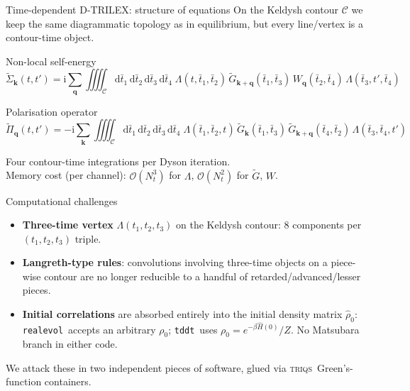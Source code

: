 \documentclass[10pt,aspectratio=169]{beamer}
\newcommand{\Sigmat}{\Sigma}
\newcommand{\Lam}{\Lambda}
\newcommand{\realevol}{\texttt{realevol}}
\newcommand{\tddt}{\texttt{tddt}}
\newcommand{\triqs}{\textsc{triqs}}
\begin{document}
\begin{frame}{Time-dependent D-TRILEX: structure of equations}
  \small
  On the Keldysh contour $\mathcal{C}$ we keep the same diagrammatic
  topology as in equilibrium, but every line/vertex is a contour-time
  object.

  \medskip
  \begin{block}{Non-local self-energy}
    \[
    \tilde \Sigmat_{\bm{k}}(t,t')
    = \mathrm{i}\!\sum_{\bm{q}}\!\!\iiiint_\mathcal{C}\!\!
    \mathrm{d}\bar t_1\,\mathrm{d}\bar t_2\,
    \mathrm{d}\bar t_3\,\mathrm{d}\bar t_4\;
    \Lam(t,\bar t_1,\bar t_2)\,
    \tilde G_{\bm{k}+\bm{q}}(\bar t_1,\bar t_3)\,
    W_{\bm{q}}(\bar t_2,\bar t_4)\,
    \Lam(\bar t_3,t',\bar t_4)
    \]
  \end{block}
  \begin{block}{Polarisation operator}
    \[
    \tilde\Pi_{\bm{q}}(t,t')
    = -\mathrm{i}\!\sum_{\bm{k}}\!\!\iiiint_\mathcal{C}\!\!
    \mathrm{d}\bar t_1\,\mathrm{d}\bar t_2\,
    \mathrm{d}\bar t_3\,\mathrm{d}\bar t_4\;
    \Lam(\bar t_1,\bar t_2,t)\,
    \tilde G_{\bm{k}}(\bar t_1,\bar t_3)\,
    \tilde G_{\bm{k}+\bm{q}}(\bar t_4,\bar t_2)\,
    \Lam(\bar t_3,\bar t_4,t')
    \]
  \end{block}
  \vspace{-0.3em}
  Four contour-time integrations per Dyson iteration.\\
  Memory cost (per channel): $\mathcal{O}(N_t^3)$ for $\Lambda$,
  $\mathcal{O}(N_t^2)$ for $\tilde G$, $W$.
\end{frame}

\begin{frame}{Computational challenges}
  \begin{itemize}
    \item \textbf{Three-time vertex} $\Lambda(t_1,t_2,t_3)$ on the
          Keldysh contour: $8$ components per $(t_1,t_2,t_3)$ triple.
    \item \textbf{Langreth-type rules}: convolutions involving three-time
          objects on a piece-wise contour are no longer reducible to a
          handful of retarded/advanced/lesser pieces.
    \item \textbf{Initial correlations} are absorbed entirely into the
          initial density matrix $\hat\rho_0$: \realevol\ accepts an
          arbitrary $\rho_0$; \tddt\ uses $\rho_0 = e^{-\beta \hat H(0)}/Z$.
          No Matsubara branch in either code.
  \end{itemize}

  \medskip
  We attack these in two independent pieces of software, glued via \triqs\ Green's-function containers.
\end{frame}
\end{document}
